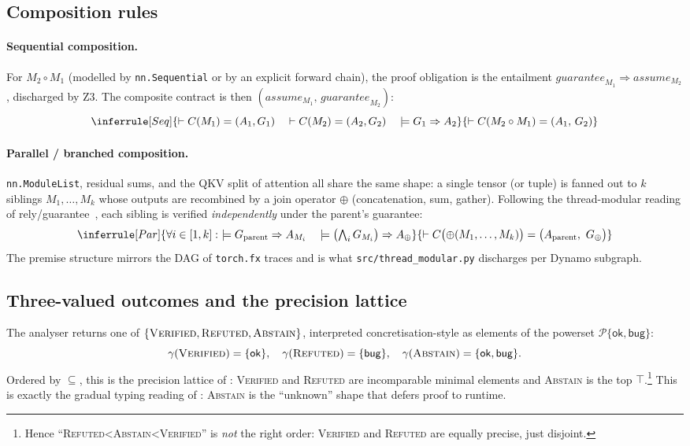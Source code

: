 \subsection{Composition rules}
\label{sec:ag:composition}

\paragraph{Sequential composition.}
For $M_2 \circ M_1$ (modelled by \texttt{nn.Sequential} or by an explicit
forward chain), the proof obligation is the entailment
$\mathit{guarantee}_{M_1}\!\Rightarrow\!\mathit{assume}_{M_2}$,
discharged by Z3.  The composite contract is then
$(\mathit{assume}_{M_1},\,\mathit{guarantee}_{M_2})$:
\[
\inferrule[Seq]
{
  \vdash C(M_1)=(A_1,G_1) \quad
  \vdash C(M_2)=(A_2,G_2) \quad
  \models G_1 \Rightarrow A_2
}
{
  \vdash C(M_2 \circ M_1) = (A_1,\,G_2)
}
\]

\paragraph{Parallel / branched composition.}
\texttt{nn.ModuleList}, residual sums, and the QKV split of attention
all share the same shape: a single tensor (or tuple) is fanned out to
$k$ siblings $M_1,\dots,M_k$ whose outputs are recombined by a join
operator $\oplus$ (concatenation, sum, gather).  Following the
thread-modular reading of rely/guarantee~\citep{jones1983tentative},
each sibling is verified \emph{independently} under the parent's
guarantee:
\[
\inferrule[Par]
{
  \forall i\in[1,k]:\ \models G_{\text{parent}}\Rightarrow A_{M_i}
  \quad
  \models \bigl(\textstyle\bigwedge_i G_{M_i}\bigr)\Rightarrow A_\oplus
}
{
  \vdash C\bigl(\oplus(M_1,\dots,M_k)\bigr)
       = \bigl(A_{\text{parent}},\ G_\oplus\bigr)
}
\]
The premise structure mirrors the DAG of \texttt{torch.fx} traces and
is what \texttt{src/thread\_modular.py} discharges per Dynamo subgraph.

\subsection{Three-valued outcomes and the precision lattice}
\label{sec:ag:three-valued}

The analyser returns one of $\{\textsc{Verified},\textsc{Refuted},\textsc{Abstain}\}$,
interpreted concretisation-style as elements of the powerset
$\mathcal{P}\{\mathsf{ok},\mathsf{bug}\}$:
\[
   \gamma(\textsc{Verified})=\{\mathsf{ok}\},\quad
   \gamma(\textsc{Refuted})=\{\mathsf{bug}\},\quad
   \gamma(\textsc{Abstain})=\{\mathsf{ok},\mathsf{bug}\}.
\]
Ordered by $\subseteq$, this is the precision lattice of
\citet{cousot1977abstract}: \textsc{Verified} and \textsc{Refuted} are
incomparable minimal elements and \textsc{Abstain} is the top
$\top$.\footnote{Hence ``\textsc{Refuted}\!<\!\textsc{Abstain}\!<\!\textsc{Verified}''
is \emph{not} the right order: \textsc{Verified} and \textsc{Refuted}
are equally precise, just disjoint.}  This is exactly the gradual
typing reading of \citet{siek2006gradual}: \textsc{Abstain} is the
``unknown'' shape that defers proof to runtime.

